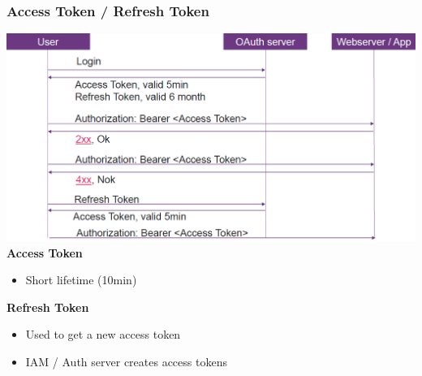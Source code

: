 \subsubsection{Access Token / Refresh Token}
\includegraphics[width=\linewidth]{img/jwt.png}
\textbf{Access Token}
\begin{itemize}
    \item Short lifetime (10min)
\end{itemize}
\textbf{Refresh Token}
\begin{itemize}
    \item Used to get a new access token
    \item IAM / Auth server creates access tokens
\end{itemize}
